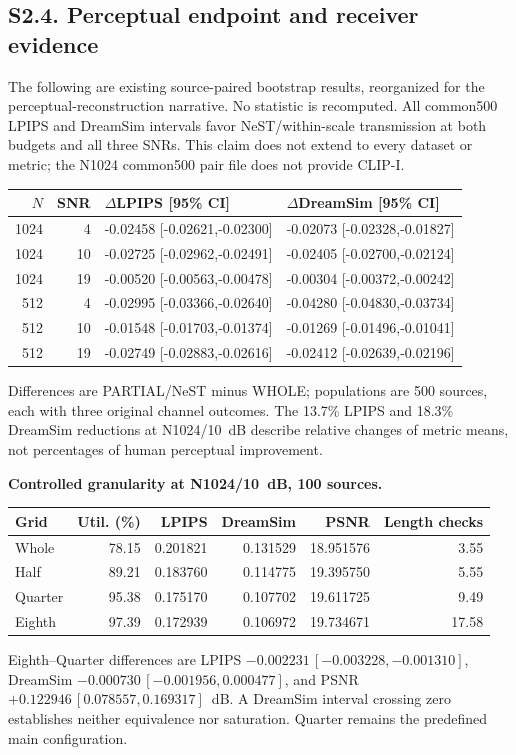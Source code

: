 \clearpage\subsection*{S2.4. Perceptual endpoint and receiver evidence}
The following are existing source-paired bootstrap results, reorganized for the perceptual-reconstruction narrative. No statistic is recomputed. All common500 LPIPS and DreamSim intervals favor NeST/within-scale transmission at both budgets and all three SNRs. This claim does not extend to every dataset or metric; the N1024 common500 pair file does not provide CLIP-I.
\begin{center}\small\begin{tabular}{rrll}\toprule $N$ & SNR & $\Delta$LPIPS [95\% CI] & $\Delta$DreamSim [95\% CI]\\\midrule
1024 & 4 & -0.02458 [-0.02621,-0.02300] & -0.02073 [-0.02328,-0.01827]\\
1024 & 10 & -0.02725 [-0.02962,-0.02491] & -0.02405 [-0.02700,-0.02124]\\
1024 & 19 & -0.00520 [-0.00563,-0.00478] & -0.00304 [-0.00372,-0.00242]\\
512 & 4 & -0.02995 [-0.03366,-0.02640] & -0.04280 [-0.04830,-0.03734]\\
512 & 10 & -0.01548 [-0.01703,-0.01374] & -0.01269 [-0.01496,-0.01041]\\
512 & 19 & -0.02749 [-0.02883,-0.02616] & -0.02412 [-0.02639,-0.02196]\\
\bottomrule\end{tabular}\end{center}
Differences are PARTIAL/NeST minus WHOLE; populations are 500 sources, each with three original channel outcomes. The 13.7\% LPIPS and 18.3\% DreamSim reductions at N1024/10~dB describe relative changes of metric means, not percentages of human perceptual improvement.

\textbf{Controlled granularity at N1024/10~dB, 100 sources.}
\begin{center}\small\begin{tabular}{lrrrrr}\toprule Grid & Util. (\%) & LPIPS & DreamSim & PSNR & Length checks\\\midrule
Whole & 78.15 & 0.201821 & 0.131529 & 18.951576 & 3.55\\
Half & 89.21 & 0.183760 & 0.114775 & 19.395750 & 5.55\\
Quarter & 95.38 & 0.175170 & 0.107702 & 19.611725 & 9.49\\
Eighth & 97.39 & 0.172939 & 0.106972 & 19.734671 & 17.58\\
\bottomrule\end{tabular}\end{center}
Eighth--Quarter differences are LPIPS $-0.002231\,\allowbreak[-0.003228,-0.001310]$, DreamSim $-0.000730\,\allowbreak[-0.001956,0.000477]$, and PSNR $+0.122946\,\allowbreak[0.078557,0.169317]$~dB. A DreamSim interval crossing zero establishes neither equivalence nor saturation. Quarter remains the predefined main configuration.


